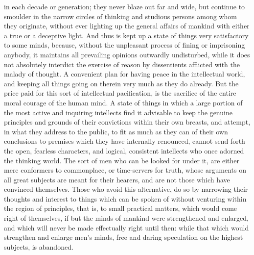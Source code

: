 \documentclass[12pt]{article}
\begin{document}
in each decade or generation; they never blaze out far and wide, but continue to smoulder in the narrow circles of thinking and studious persons among whom they originate, without ever lighting up the general affairs of mankind with either a true or a deceptive light. And thus is kept up a state of things very satisfactory to some minds, because, without the unpleasant process of fining or imprisoning anybody, it maintains all prevailing opinions outwardly undisturbed, while it does not absolutely interdict the exercise of reason by dissentients afflicted with the malady of thought. A convenient plan for having peace in the intellectual world, and keeping all things going on therein very much as they do already. But the price paid for this sort of intellectual pacification, is the sacrifice of the entire moral courage of the human mind. A state of things in which a large portion of the most active and inquiring intellects find it advisable to keep the genuine principles and grounds of their convictions within their own breasts, and attempt, in what they address to the public, to fit as much as they can of their own conclusions to premises which they have internally renounced, cannot send forth the open, fearless characters, and logical, consistent intellects who once adorned the thinking world. The sort of men who can be looked for under it, are either mere conformers to commonplace, or time-servers for truth, whose arguments on all great subjects are meant for their hearers, and are not those which have convinced themselves. Those who avoid this alternative, do so by narrowing their thoughts and interest to things which can be spoken of without venturing within the region of principles, that is, to small practical matters, which would come right of themselves, if but the minds of mankind were strengthened and enlarged, and which will never be made effectually right until then: while that which would strengthen and enlarge men's minds, free and daring speculation on the highest subjects, is abandoned.
\end{document}
